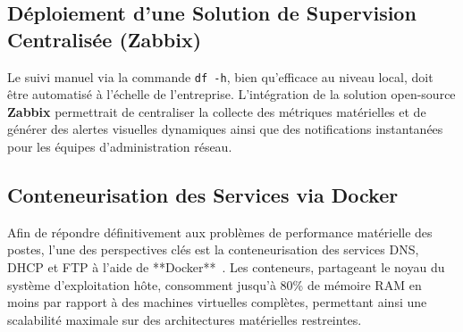 \subsection{Déploiement d'une Solution de Supervision Centralisée (Zabbix)}
Le suivi manuel via la commande \texttt{df -h}, bien qu'efficace au niveau local, doit être automatisé à l'échelle de l'entreprise. L'intégration de la solution open-source \textbf{Zabbix} permettrait de centraliser la collecte des métriques matérielles et de générer des alertes visuelles dynamiques ainsi que des notifications instantanées pour les équipes d'administration réseau.

\subsection{Conteneurisation des Services via Docker}
Afin de répondre définitivement aux problèmes de performance matérielle des postes, l'une des perspectives clés est la conteneurisation des services DNS, DHCP et FTP à l'aide de **Docker**~\cite{docker_doc}. Les conteneurs, partageant le noyau du système d'exploitation hôte, consomment jusqu'à 80\% de mémoire RAM en moins par rapport à des machines virtuelles complètes, permettant ainsi une scalabilité maximale sur des architectures matérielles restreintes.